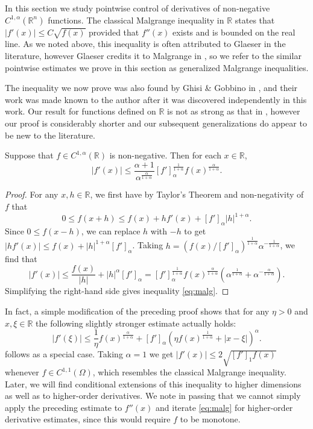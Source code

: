 \documentclass[oneside,hidelinks,indentfirst,10pt]{book}
\begin{document}
In this section we study pointwise control of derivatives of non-negative \(C^{1,\alpha}(\mathbb{R}^n)\) functions. The classical Malgrange inequality in \(\mathbb{R}\) states that \(|f'(x)|\leq C\sqrt{f(x)}\) provided that \(f''(x)\) exists and is bounded on the real line. As we noted above, this inequality is often attributed to Glaeser in the literature, however Glaeser credits it to Malgrange in \cite{Glaeser}, so we refer to the similar pointwise estimates we prove in this section as generalized Malgrange inequalities. 


The inequality we now prove was also found by Ghisi \& Gobbino in \cite{Gobbino}, and their work was made known to the author after it was discovered independently in this work. Our result for functions defined on \(\mathbb{R}\) is not as strong as that in \cite{Gobbino}, however our proof is considerably shorter and our subsequent generalizations do appear to be new to the literature.


\begin{thm}\label{thm:malgrangeineq}
Suppose that \(f\in C^{1,\alpha}(\mathbb{R})\) is non-negative. Then for each \(x\in\mathbb{R}\), 
\begin{equation}\label{eq:malg}
    |f'(x)|\leq \frac{\alpha+1}{\alpha^\frac{\alpha}{1+\alpha}}[f']_\alpha^\frac{1}{1+\alpha}f(x)^\frac{\alpha}{1+\alpha}.    
\end{equation}
\end{thm}


\begin{proof} 
For any \(x,h\in\mathbb{R}\), we first have by Taylor's Theorem and non-negativity of \(f\) that
\[
    0\leq f(x+h)\leq f(x)+hf'(x)+[f']_\alpha|h|^{1+\alpha}.
\]
Since \(0\leq f(x-h)\), we can replace \(h\) with \(-h\) to get \(|hf'(x)|\leq f(x)+|h|^{1+\alpha}[f']_\alpha\). Taking \(h=(f(x)/[f']_\alpha)^\frac{1}{1+\alpha}\alpha^{-\frac{1}{1+\alpha}}\), we find that
\[
    |f'(x)|\leq \frac{f(x)}{|h|}+|h|^\alpha[f']_\alpha=[f']_\alpha^\frac{1}{1+\alpha}f(x)^\frac{\alpha}{1+\alpha}(\alpha^{\frac{1}{1+\alpha}}+\alpha^{-\frac{\alpha}{1+\alpha}}).
\]
Simplifying the right-hand side gives inequality \eqref{eq:malg}.
\end{proof}


In fact, a simple modification of the preceding proof shows that for any \(\eta>0\) and \(x,\xi\in\mathbb{R}\) the following slightly stronger estimate actually holds:
\[
    |f'(\xi)|\leq \frac{1}{\eta}f(x)^\frac{\alpha}{1+\alpha}+[f']_\alpha(\eta f(x)^\frac{1}{1+\alpha}+|x-\xi|)^\alpha.
\]
 follows as a special case. Taking \(\alpha=1\) we get \(|f'(x)|\leq 2\sqrt{[f']_1f(x)}\) whenever \(f\in C^{1,1}(\Omega)\), which resembles the classical Malgrange inequality. Later, we will find conditional extensions of this inequality to higher dimensions as well as to higher-order derivatives. We note in passing that we cannot simply apply the preceding estimate to \(f''(x)\) and iterate \eqref{eq:malg} for higher-order derivative estimates, since this would require \(f\) to be monotone. 
\end{document}
